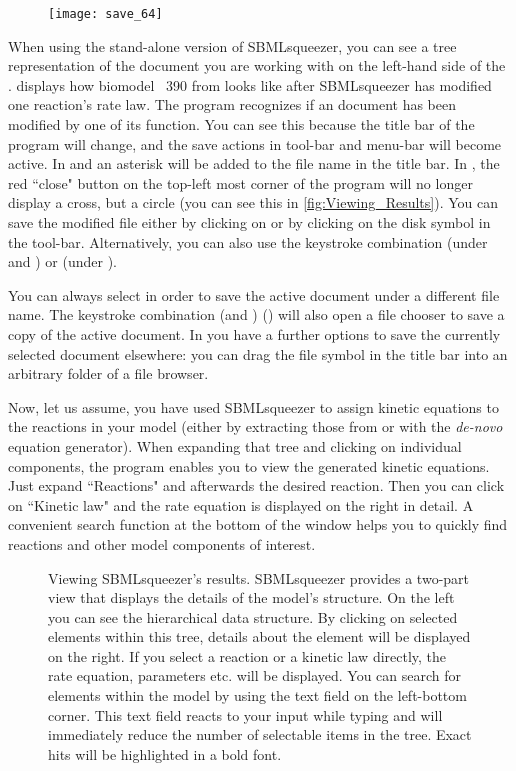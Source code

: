 \begin{figure}
\vspace{\wrapfigspace}
\texttt{[image: save\_64]}
\end{figure}
When using the stand-alone version of SBMLsqueezer, you can see a tree representation of the \SBML document you are working with on the left-hand side of the \GUI.
 displays how biomodel \numero~390 from \BioModels \citep{Li2010a} looks like after SBMLsqueezer has modified one reaction's rate law.
The program recognizes if an \SBML document has been modified by one of its function.
You can see this because the title bar of the program will change, and the save actions in tool-bar and menu-bar will become active.
In \Windows and \Linux an asterisk will be added to the file name in the title bar.
In \MacOSX, the red ``close" button on the top-left most corner of the program will no longer display a cross, but a circle (you can see this in \vref{fig:Viewing_Results}).
You can save the modified file either by clicking on  or by clicking on the disk symbol in the tool-bar.
Alternatively, you can also use the keystroke combination  (under \Windows and \Linux) or  (under \MacOSX).

You can always select  in order to save the active \SBML document under a different file name.
The keystroke combination  (\Windows and \Linux)  (\MacOSX) will also open a file chooser to save a copy of the active \SBML document.
In \MacOSX you have a further options to save the currently selected document elsewhere: you can drag the file symbol in the title bar into an arbitrary folder of a file browser.

Now, let us assume, you have used SBMLsqueezer to assign kinetic equations to the reactions in your model (either by extracting those from \SABIO or with the \emph{de-novo} equation generator).
When expanding that tree and clicking on individual components, the program enables you to view the generated kinetic equations.
Just expand ``Reactions" and afterwards the desired reaction.
Then you can click on ``Kinetic law" and the rate equation is displayed on the right in detail.
A convenient search function at the bottom of the window helps you to quickly find reactions and other model components of interest.
\begin{figure}[t!]
\caption[Viewing SBMLsqueezer's results]{Viewing SBMLsqueezer's results.
SBMLsqueezer provides a two-part view that displays the details of the model's structure.
On the left you can see the hierarchical \SBML data structure.
By clicking on selected elements within this tree, details about the element will be displayed on the right.
If you select a reaction or a kinetic law directly, the rate equation, parameters etc. will be displayed.
You can search for elements within the model by using the text field on the left-bottom corner.
This text field reacts to your input while typing and will immediately reduce the number of selectable items in the tree.
Exact hits will be highlighted in a bold font.}
\label{fig:Viewing_Results}
\end{figure}

